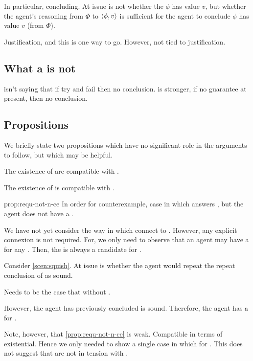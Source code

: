 \begin{note}
  In particular, concluding.
  At issue is not whether the \(\phi\) has value \(v\), but whether the agent's reasoning from \(\Phi\) to \(\langle \phi, v \rangle\) is sufficient for the agent to conclude \(\phi\) has value \(v\) (from \(\Phi\)).

  Justification, and this is one way to go.
  However, not tied to justification.
\end{note}

\subsection{What a \requ{} is not}

\begin{note}
  \requ{} isn't saying that if try and fail then no conclusion.
  \requ{} is stronger, if no guarantee at present, then no conclusion.
\end{note}

\subsection{Propositions}
\label{sec:propsoitions}

\begin{note}
  We briefly state two propositions which have no significant role in the arguments to follow, but which may be helpful.
\end{note}

\begin{note}
  The existence of  are compatible with \issueConstraint{}.
  \begin{proposition}
    \label{prop:requ-not-n-ce}
    The existence of  is compatible with \issueConstraint{}.
  \end{proposition}
  \begin{argument}{prop:requ-not-n-ce}
    In order for counterexample, case in which \ros{} answers \qWhyV{}, but the agent does not have a \wit{}.

    We have not yet consider the way in which  connect to \qWhyV{}.
    However, any explicit connexion is not required.
    For, we only need to observe that an agent may have a \wit{} for any \requ{}.
    Then, the \wit{} is always a candidate for \qHowV{}.

    Consider \autoref{scen:squish}.
    At issue is whether the agent would repeat the repeat conclusion of \sqE{} as sound.

    Needs to be the case that \ros{} without \wit{}.

    However, the agent has previously concluded \sqE{} is sound.
    Therefore, the agent has a \wit{} for \ros{}.
  \end{argument}

  Note, however, that \autoref{prop:requ-not-n-ce} is weak.
  Compatible in terms of existential.
  Hence we only needed to show a single case in which \wit{} for \requ{}.
  This does not suggest that  are not in tension with \issueConstraint{}.
\end{note}

